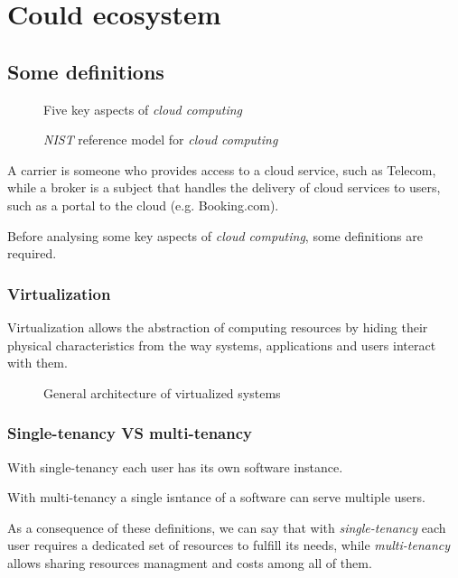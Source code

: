 \chapter{Could ecosystem}
\section{Some definitions}
\begin{figure}[h!]
    \centering
    \caption{Five key aspects of \emph{cloud computing}}
\end{figure}
\begin{figure}[h!]
    \centering
    \caption{\emph{NIST} reference model for \emph{cloud computing}}
\end{figure}
\begin{note}
    A carrier is someone who provides access to a cloud service, such as
    Telecom, while a broker is a subject that handles the delivery of cloud
    services to users, such as a portal to the cloud (e.g. Booking.com).
\end{note}

\noindent Before analysing some key aspects of \emph{cloud computing}, some
definitions are required.

\subsection{Virtualization}
\begin{definition}[Virtualization]
    Virtualization allows the abstraction of computing resources by hiding
    their physical characteristics from the way systems, applications and users
    interact with them.
\end{definition}

\begin{figure}[h!]
    \centering
    \hspace{1.5cm}
    \caption{General architecture of virtualized systems}
\end{figure}

\subsection{Single-tenancy VS multi-tenancy}
\begin{definition}
    With single-tenancy each user has its own software instance.
\end{definition}
\begin{definition}
    With multi-tenancy a single isntance of a software can serve multiple users.
\end{definition}\noindent
As a consequence of these definitions, we can say that with \emph{single-tenancy}
each user requires a dedicated set of resources to fulfill its needs, while
\emph{multi-tenancy} allows sharing resources managment and costs among all of
them.

